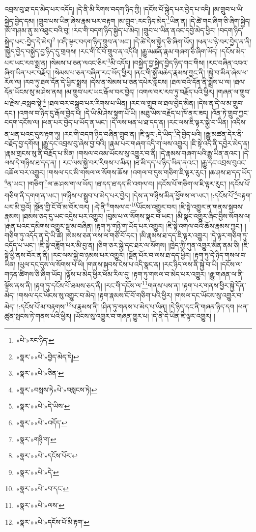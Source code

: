 འབྲས་བུ་ཐ་དད་མེད་པར་འདོད། །དེ་ནི་མི་རིགས་བདག་ཉིད་ཀྱི། །དངོས་པོ་སྐྱེད་པར་བྱེད་པ་འདི། །མ་གྲུབ་པ་ཡི་སྐྱེད་བྱེད་དམ། །གྲུབ་པས་ཡིན་ཞེས་རྣམ་པར་བརྟག །མ་གྲུབ་:རང་ཉིད་མེད་\footnote{«པེ་»རང་ཉིད་}ཡིན་ན། །དེ་ཚེ་གང་ཞིག་ཅི་ཞིག་སྐྱེད། །མོ་གཤམ་ནུ་མ་འཐུང་བའི་བུ། །རང་གི་བདག་ཉིད་སྐྱེད་པ་མེད། །གྲུབ་པ་ཡིན་ནའང་དབྱེ་མེད་ཕྱིར། །བདག་ཉིད་སྐྱེད་པར་:བྱེད་དེ་མེད།\footnote{«སྣར་»«པེ་»བྱེད་མེད་དེ།} །འདི་ལྟར་བདག་ཉིད་གྲུབ་ན་ཡང་། །དེ་ཚེ་དེས་སྐྱེད་ཅི་ཞིག་ཡོད། །ཕན་པ་ཉེ་བར་བྱེད་ན་ནི། །སྐྱེད་བྱེད་བསྐྱེད་བྱ་ཉིད་དུ་གྲགས། །རང་གི་ངོ་བོ་གྲུབ་ན་འདིའི། །རྒྱུ་མཚན་རྣམ་གཞག་ཅི་ཞིག་ཡོད། །དངོས་མེད་པར་ཡང་རབ་སྨྲ་ན། །སེམས་པ་ཅན་ལའང་ཅིར་\footnote{«སྣར་»«པེ་»ཅིན་}མི་འདོད། །བསྐྱེད་བྱ་སྐྱེད་བྱེད་ཉིད་གང་གིས། །རང་བཞིན་འབའ་ཞིག་ཡིན་པར་བརྗོད། །སེམས་པ་ཅན་བཞིན་རང་ཡོད་ཕྱིར། །ནང་གི་སྐྱེ་མཆེད་རྣམས་ཀྱང་ནི། །སྐྱེ་བ་མིན་ཞེས་ཕ་རོལ་ལ། །རབ་ཏུ་ཐལ་དོན་དེ་ཕྱིར་སྨྲས། །དེས་ན་སེམས་པ་ཅན་དཔེར་བླངས། །ཐལ་བའི་དོན་ནི་སྨྲས་པ་ལ། །ཐལ་དོན་ཡོངས་སུ་མ་ཤེས་ནས། །མ་གྲུབ་པར་ཡང་རྒོལ་བར་བྱེད། །འགལ་བར་རབ་ཏུ་བརྗོད་པའི་ཕྱིར། །གཞན་ལ་གྲུབ་པ་རྗེས་:བསླབ་སྟེ།\footnote{«སྣར་»བསླས་ཏེ«པེ་»བསླངས་ཏེ།} །ཐལ་བར་བསྒྲུབ་པར་རིགས་པ་ཡིན། །རང་ལ་གྲུབ་ལ་ཐལ་བྱེད་མིན། །དེས་ན་དེ་ལ་མ་གྲུབ་དང་། །འགལ་བ་ཉིད་དུ་རྒོལ་བྱེད་པ། །དེ་ཡི་མི་ཤེས་སྟུག་པོ་ཡི། །མཐུ་ཡིས་བརྗོད་པ་ཁོ་ནར་ཟད། །འོན་ཏེ་གྲུབ་ཀྱང་བདག་དངོས་ལ། །ཕན་པར་བྱེད་པ་ཡོད་ན་ཡང་། །དེ་ལས་ཕན་པ་ཐ་དད་ན། །རང་ལས་ཇི་ལྟར་སྐྱེ་བ་ཡིན། །འདིས་ན་ཕན་པའང་དུས་རྟག་ཏུ། །རང་གི་བདག་ཉིད་བཞིན་གྲུབ་ན། །ཇི་ལྟར་:དེ་ཡིད་\footnote{«སྣར་»«པེ་»དེ་ཡིས་}དེ་བྱེད་པའི། །རྒྱུ་མཚན་དེར་ནི་བརྗོད་བྱ་དགོས། །རྒྱུ་དང་འབྲས་བུ་ཞེས་བྱ་བའི། །རྣམ་པར་གཞག་འདི་ག་ལས་འགྱུར། །ཇི་སྟེ་འདི་ནི་དབྱེར་མེད་ན། །རྣམ་གྲངས་སུ་ནི་བརྗོད་པ་མིན། །གསལ་བའམ་ཡོངས་སུ་འགྱུར་བ་ནི། །དེ་རྣམས་གཞག་པའི་རྒྱུ་ཡིན་ནའང་། །དེ་ལས་དེ་གཉིས་ཐ་དད་ན། །
རང་ལས་སྐྱེ་བར་རིགས་པ་མིན། །ཐ་མི་དད་པ་ཉིད་ཡིན་ནའང་། །རྒྱུ་དང་འབྲས་བུའང་འཆོལ་བར་འགྱུར། །གསལ་དང་མི་གསལ་ལ་སོགས་ཆོས། །འགལ་བ་དུས་གཅིག་ཇི་ལྟར་རུང་། །ཆ་ཤས་ཐ་དད་ཡོད་\footnote{«སྣར་»«པེ་»འདོད་}ན་ཡང་། །གཅིག་\footnote{«སྣར་»གཉི་ག་}ལ་ཆ་ཤས་ག་ལ་ཡོད། །ཐ་དད་ཐ་དད་མི་འགལ་བ། །དངོས་པོ་གཅིག་ལ་ཇི་ལྟར་རུང་། །དངོས་པོ་གཅིག་ནི་དགག་ན་ཡང་། །གཉིས་པ་སྒྲུབ་པ་མེད་པར་བྱེད། །དེས་ན་གཉིས་མིན་ཕྱོགས་ལ་ཡང་། །:དངོས་པོ་\footnote{«སྣར་»«པེ་»དངོས་པོར་}བརྟག་པར་མི་བྱའོ། །སྔོན་གྱི་ངོ་བོ་མ་བོར་བར། །:དེ་ནི་\footnote{«སྣར་»«པེ་»དེ་}གསལ་བ་\footnote{«སྣར་»«པེ་»བ་དང་}ཡོངས་འགྱུར་བར། །ཇི་སྟེ་འགྱུར་ན་གནས་སྐབས་རྣམས། །ཐམས་ཅད་དུ་ཡང་འདྲེས་པར་འགྱུར། །བུམ་པ་ལ་སོགས་སྣང་བ་ཡང་། །མི་སྣང་འགྱུར་ཞིང་བྱིས་སོགས་ལ། །རྒན་པའང་དམིགས་འགྱུར་སྔ་མ་བཞིན། །རྟག་ཏུ་གཉི་ག་ཡོད་པར་འགྱུར། །ཇི་སྟེ་འགལ་བའི་ཆོས་རྣམས་ཀྱང་། །གཅིག་ཏུ་འདོད་ན་དེ་ཡི་ཚེ། །སེམས་ཅན་ལས་ལ་གཙོ་བོ་དང་། །མི་རྣམས་ཐ་དད་ཇི་ལྟར་འགྱུར། །དེ་ལྟར་གཅིག་ཏུ་འདོད་པ་ཡང་། །ཇི་སྟེ་བཟློག་པར་མི་བྱ་ན། །ཅིག་ཅར་སྐྱེ་དང་ཐར་ལ་སོགས། །ཁྱེད་ཀྱི་ཀུན་འགྱུར་མིན་ནམ་ཅི། །ཇི་སྟེ་ཕྱི་ནས་བོར་ན་ནི། །རང་ལས་སྐྱེ་བ་ཉམས་པར་འགྱུར། །སྔོན་པོར་བ་ལས་ཐ་དད་ཕྱིར། །རྟག་ཏུ་དེ་ཉིད་གསལ་བ་ཡིན། །ཡུལ་དང་དུས་ལ་སོགས་པ་ཡི། །གནས་སྐབས་ངེས་པ་འདི་སྣང་ན། །རང་ཉིད་ལས་ནི་སྐྱེ་བ་ཡི། །དངོས་ལ་གཏན་ཚིགས་ཅི་ཞིག་ཡོད། །ལྟོས་པ་མེད་ཕྱིར་ཕོམ་རིལ་དུ། །རྟག་ཏུ་གསལ་བ་མེད་པར་འགྱུར། །རྒྱུ་གཞན་ལ་ནི་ལྟོས་ནས་ནི། །རྟག་ཏུ་དངོས་པོ་ཐམས་ཅད་ནི། །རང་གི་དངོས་ལ་\footnote{«སྣར་»«པེ་»ལས་}གནས་པས་ན། །རྟག་པར་གནས་ཕྱིར་སྐྱེ་དོན་མེད། །གསལ་དང་ཡོངས་སུ་འགྱུར་བ་མེད། །རྟག་རྣམས་ངོ་བོ་གཅིག་པའི་ཕྱིར། །གསལ་དང་ཡོངས་སུ་འགྱུར་བ་མེད། །:དངོས་པོ་མ་བརྟགས་\footnote{«སྣར་»«པེ་»དངོས་པོ་མི་རྟག་}པ་རྣམས་ནི། །ཤིན་ཏུ་གནས་པ་མེད་པ་ཡིན། །དེ་ཉིད་དང་ནི་གཞན་ཉིད་དག །ཕན་ཚུན་སྤངས་ཏེ་གནས་པའི་ཕྱིར། །ཡོངས་སུ་འགྱུར་བ་གཞན་གྱུར་པ། །དེ་ནི་དེ་ཡིན་ཇི་ལྟར་འགྱུར། །
